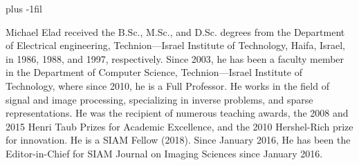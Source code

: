 \documentclass[journal]{IEEEtran}
\begin{document}
\vskip -20pt plus -1fil



\begin{IEEEbiography}{Michael Elad}
received the B.Sc., M.Sc., and
D.Sc. degrees from the Department of Electrical engineering, Technion—Israel Institute of Technology,
Haifa, Israel, in 1986, 1988, and 1997, respectively.
Since 2003, he has been a faculty member in the
Department of Computer Science, Technion—Israel
Institute of Technology, where since 2010, he is a
Full Professor. He works in the field of signal and
image processing, specializing in inverse problems,
and sparse representations. He was the recipient of
numerous teaching awards, the 2008 and 2015 Henri
Taub Prizes for Academic Excellence, and the 2010 Hershel-Rich prize for innovation. He is a SIAM Fellow (2018). Since January 2016, He has been the
Editor-in-Chief for SIAM Journal on Imaging Sciences since January 2016.
\end{IEEEbiography}
\end{document}
